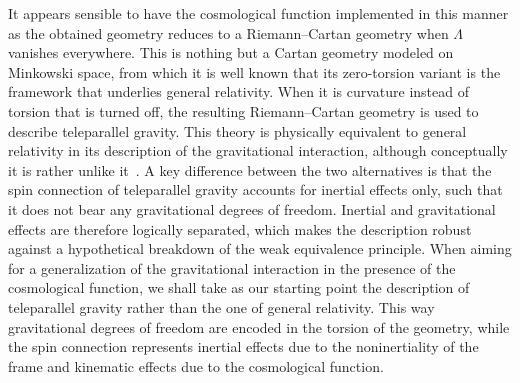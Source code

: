 \documentclass[
final,
11pt,
a4paper,
DIV=11,
headinclude=true,
footinclude=false,
bibliography=totoc,
twoside=true,  %
BCOR=5mm
]{scrbook}
\begin{document}
It appears sensible to have the cosmological function implemented 
in this manner as the obtained geometry reduces to 
a Riemann--Cartan geometry when $\Lambda$ vanishes everywhere.  
This is nothing but a Cartan geometry modeled on Minkowski space, 
from which it is well known that its zero-torsion variant is the 
framework that underlies general relativity. When it is curvature 
instead of torsion that is turned off, the resulting 
Riemann--Cartan geometry is used to describe teleparallel 
gravity. This theory is physically equivalent to general 
relativity in its description of the gravitational interaction, 
although conceptually it is rather unlike 
it~\cite{aldrovandi:2012tele}.  A key difference between the two 
alternatives is that the spin connection of teleparallel gravity 
accounts for inertial effects only, such that it does not bear 
any gravitational degrees of freedom. Inertial and gravitational 
effects are therefore logically separated, which makes the 
description robust against a hypothetical breakdown of the weak 
equivalence principle. When aiming for a generalization of the 
gravitational interaction in the presence of the cosmological 
function, we shall take as our starting point the description of 
teleparallel gravity rather than the one of general relativity.  
This way gravitational degrees of freedom are encoded in the 
torsion of the geometry, while the spin connection represents 
inertial effects due to the noninertiality of the frame and 
kinematic effects due to the cosmological function. 
\end{document}
